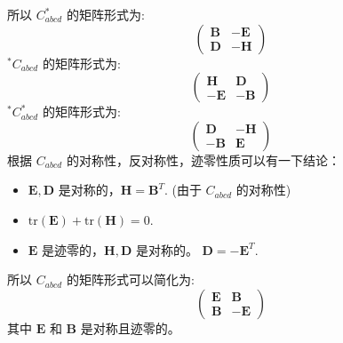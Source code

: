 \documentclass[lang=cn,a4paper,newtx]{elegantpaper}
\begin{document}
所以 $C^*_{abcd}$ 的矩阵形式为:
$$
\begin{pmatrix}
    \boldsymbol{B} & -\boldsymbol{E}\\
    \boldsymbol{D} & -\boldsymbol{H}
\end{pmatrix}
$$
$^*C_{abcd}$ 的矩阵形式为:
$$
\begin{pmatrix}
    \boldsymbol{H} & \boldsymbol{D}\\
    -\boldsymbol{E} & -\boldsymbol{B}
\end{pmatrix}
$$
$^*C_{abcd}^*$ 的矩阵形式为:
$$
\begin{pmatrix}
    \boldsymbol{D} & -\boldsymbol{H}\\
    -\boldsymbol{B} & \boldsymbol{E}
\end{pmatrix}
$$
根据 $C_{abcd}$ 的对称性，反对称性，迹零性质可以有一下结论：
\begin{itemize}
    \item $\boldsymbol{E}, \boldsymbol{D}$ 是对称的，$\boldsymbol{H} =
        \boldsymbol{B}^T$. (由于 $C_{abcd}$ 的对称性)
    \item $\mathrm{tr}(\boldsymbol{E}) + \mathrm{tr}(\boldsymbol{H}) = 0$.
    \item $\boldsymbol{E}$ 是迹零的，$\boldsymbol{H}, \boldsymbol{D}$ 是对称的。
        $\boldsymbol{D} = -\boldsymbol{E}^T$.
\end{itemize}
所以 $C_{abcd}$ 的矩阵形式可以简化为:
$$
\begin{pmatrix}
    \boldsymbol{E} & \boldsymbol{B}\\
    \boldsymbol{B} & -\boldsymbol{E}
\end{pmatrix}
$$
其中 $\boldsymbol{E}$ 和 $\boldsymbol{B}$ 是对称且迹零的。
\end{document}
